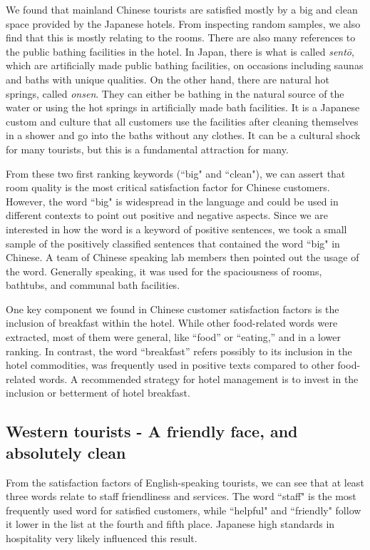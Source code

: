 \documentclass[smallextended,natbib]{svjour3}       %
\begin{document}
    We found that mainland Chinese tourists are satisfied mostly by a big and clean space provided by the Japanese hotels. From inspecting random samples, we also find that this is mostly relating to the rooms. There are also many references to the public bathing facilities in the hotel. In Japan, there is what is called \textit{sent\=o}, which are artificially made public bathing facilities, on occasions including saunas and baths with unique qualities. On the other hand, there are natural hot springs, called \textit{onsen}. They can either be bathing in the natural source of the water or using the hot springs in artificially made bath facilities. It is a Japanese custom and culture that all customers use the facilities after cleaning themselves in a shower and go into the baths without any clothes. It can be a cultural shock for many tourists, but this is a fundamental attraction for many.

    From these two first ranking keywords (``big" and ``clean"), we can assert that room quality is the most critical satisfaction factor for Chinese customers. However, the word ``big" is widespread in the language and could be used in different contexts to point out positive and negative aspects. Since we are interested in how the word is a keyword of positive sentences, we took a small sample of the positively classified sentences that contained the word ``big" in Chinese. A team of Chinese speaking lab members then pointed out the usage of the word. Generally speaking, it was used for the spaciousness of rooms, bathtubs, and communal bath facilities. 

    One key component we found in Chinese customer satisfaction factors is the inclusion of breakfast within the hotel. While other food-related words were extracted, most of them were general, like “food” or “eating,” and in a lower ranking. In contrast, the word “breakfast” refers possibly to its inclusion in the hotel commodities, was frequently used in positive texts compared to other food-related words. A recommended strategy for hotel management is to invest in the inclusion or betterment of hotel breakfast. 

  \subsection{Western tourists - A friendly face, and absolutely clean}\label{disc:en}

    From the satisfaction factors of English-speaking tourists, we can see that at least three words relate to staff friendliness and services. The word ``staff" is the most frequently used word for satisfied customers, while ``helpful" and ``friendly" follow it lower in the list at the fourth and fifth place. Japanese high standards in hospitality very likely influenced this result.
\end{document}
